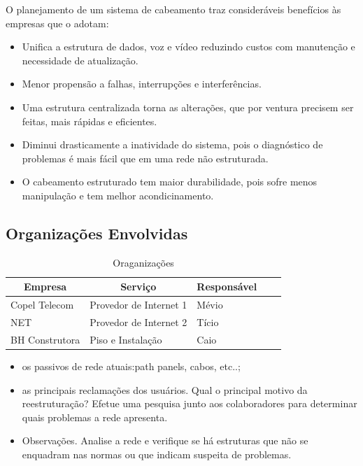 \documentclass[	DIV=calc,%
paper=a4,%
fontsize=12pt,%
onecolumn]{scrartcl}	 					%
\begin{document}
	O planejamento de um sistema de cabeamento traz consideráveis benefícios às empresas que o adotam:
	\begin{itemize}
		\item Unifica a estrutura de dados, voz e vídeo reduzindo custos com manutenção e necessidade de atualização.
		\item Menor propensão a falhas, interrupções e interferências.
		\item Uma estrutura centralizada torna as alterações, que por ventura precisem ser feitas, mais rápidas e eficientes.
		\item Diminui drasticamente a inatividade do sistema, pois o diagnóstico de problemas é mais fácil que em uma rede não estruturada.
		\item O cabeamento estruturado tem maior durabilidade, pois sofre menos manipulação e tem melhor acondicinamento. 
	\end{itemize}
	\subsection{Organizações Envolvidas}
	\begin{table}[h!] %
		\centering
		\caption{Oraganizações}
		\label{tab1} %
		\begin{tabular}{|l|l|l|l|l|}
			\hline
			\multicolumn{1}{|c|}{\textbf{Empresa}} & \multicolumn{1}{c|}{\textbf{Serviço}} & \multicolumn{1}{c|}{\textbf{Responsável}} \\ \hline
			Copel Telecom                          & Provedor de Internet 1              & Mévio \\ \hline
			NET                                         & Provedor de Internet 2              & Tício \\ \hline
			BH Construtora                              & Piso e Instalação              & Caio\\ \hline
		\end{tabular}
	\end{table}
	
	\begin{itemize}
		\item os passivos de rede atuais:path panels, cabos, etc..;
		\item as principais reclamações dos usuários. Qual o principal motivo da reestruturação? Efetue uma pesquisa junto aos colaboradores para determinar quais problemas a rede apresenta.
		\item Observações. Analise a rede e verifique se há estruturas que não se enquadram nas normas ou que indicam suspeita de problemas.
	\end{itemize}
	
\end{document}
